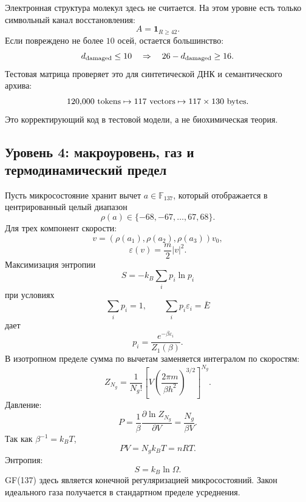 \documentclass[11pt]{article}
\begin{document}
Электронная структура молекул здесь не считается.  На этом уровне есть только
символьный канал восстановления:
\begin{equation}
    A=\mathbf{1}_{R\ge42}.
\end{equation}
Если повреждено не более $10$ осей, остается большинство:
\begin{equation}
    d_{\rm damaged}\le10
    \quad\Rightarrow\quad
    26-d_{\rm damaged}\ge16.
\end{equation}
Тестовая матрица проверяет это для синтетической ДНК и семантического архива:
\begin{equation}
    120{,}000~{\rm tokens}
    \mapsto
    117~{\rm vectors}
    \mapsto
    117\times130~{\rm bytes}.
\end{equation}
Это корректирующий код в тестовой модели, а не биохимическая теория.

\subsection{Уровень 4: макроуровень, газ и термодинамический предел}

Пусть микросостояние хранит вычет $a\in\mathbb{F}_{137}$, который отображается
в центрированный целый диапазон
\begin{equation}
    \rho(a)\in\{-68,-67,\ldots,67,68\}.
\end{equation}
Для трех компонент скорости:
\begin{equation}
    v=(\rho(a_1),\rho(a_2),\rho(a_3))v_0,
\end{equation}
\begin{equation}
    \varepsilon(v)=\frac{m}{2}|v|^2.
\end{equation}
Максимизация энтропии
\begin{equation}
    S=-k_B\sum_i p_i\ln p_i
\end{equation}
при условиях
\begin{equation}
    \sum_i p_i=1,\qquad \sum_i p_i\varepsilon_i=\bar{E}
\end{equation}
дает
\begin{equation}
    p_i=\frac{e^{-\beta\varepsilon_i}}{Z_1(\beta)}.
\end{equation}
В изотропном пределе сумма по вычетам заменяется интегралом по скоростям:
\begin{equation}
    Z_{N_g}
    =
    \frac{1}{N_g!}
    \left[
        V\left(\frac{2\pi m}{\beta h^2}\right)^{3/2}
    \right]^{N_g}.
\end{equation}
Давление:
\begin{equation}
    P=\frac{1}{\beta}\frac{\partial \ln Z_{N_g}}{\partial V}
      =
    \frac{N_g}{\beta V}.
\end{equation}
Так как $\beta^{-1}=k_BT$,
\begin{equation}
    PV=N_gk_BT=nRT.
\end{equation}
Энтропия:
\begin{equation}
    S=k_B\ln\Omega.
\end{equation}
GF(137) здесь является конечной регуляризацией микросостояний.  Закон
идеального газа получается в стандартном пределе усреднения.
\end{document}
